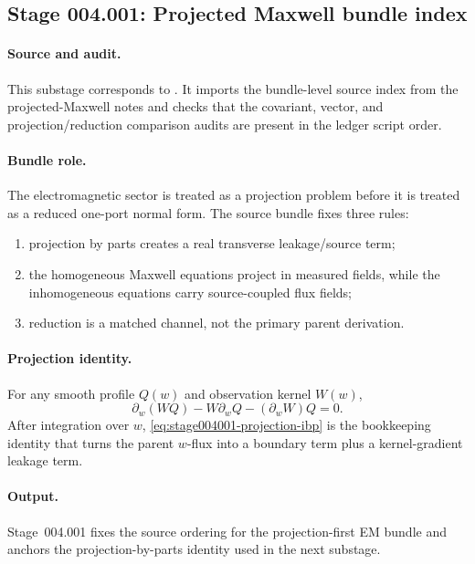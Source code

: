 \subsection*{Stage 004.001: Projected Maxwell bundle index}
\label{subsec:stage004001-projected-maxwell-readme}

\paragraph{Source and audit.}
This substage corresponds to
.
It imports the bundle-level source index from the projected-Maxwell notes and
checks that the covariant, vector, and projection/reduction comparison audits
are present in the ledger script order.

\paragraph{Bundle role.}
The electromagnetic sector is treated as a projection problem before it is
treated as a reduced one-port normal form.  The source bundle fixes three
rules:
\begin{enumerate}
\item projection by parts creates a real transverse leakage/source term;
\item the homogeneous Maxwell equations project in measured fields, while the
inhomogeneous equations carry source-coupled flux fields;
\item reduction is a matched channel, not the primary parent derivation.
\end{enumerate}

\paragraph{Projection identity.}
For any smooth profile \(Q(w)\) and observation kernel \(W(w)\),
\begin{equation}
\label{eq:stage004001-projection-ibp}
\partial_w(WQ)-W\partial_wQ-(\partial_wW)Q=0.
\end{equation}
After integration over \(w\), \eqref{eq:stage004001-projection-ibp} is the
bookkeeping identity that turns the parent \(w\)-flux into a boundary term
plus a kernel-gradient leakage term.

\paragraph{Output.}
Stage~004.001 fixes the source ordering for the projection-first EM bundle and
anchors the projection-by-parts identity used in the next substage.
